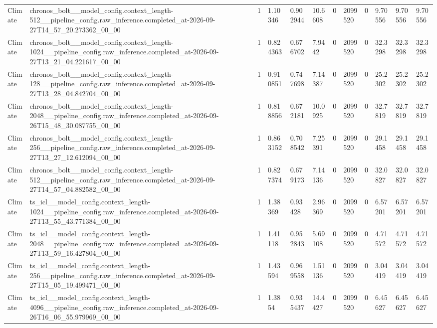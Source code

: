 \begin{tabular}{llllllllllll}
Climate & chronos\_bolt\_\_model\_config.context\_length-512\_\_pipeline\_config.raw\_inference.completed\_at-2026-09-27T14\_57\_20.273362\_00\_00 & 1 & 1.10346 & 0.902944 & 10.6608 & 0 & 2099520 & 0 & 9.70556 & 9.70556 & 9.70556 \\
Climate & chronos\_bolt\_\_model\_config.context\_length-1024\_\_pipeline\_config.raw\_inference.completed\_at-2026-09-27T13\_21\_04.221617\_00\_00 & 1 & 0.824363 & 0.676702 & 7.9442 & 0 & 2099520 & 0 & 32.3298 & 32.3298 & 32.3298 \\
Climate & chronos\_bolt\_\_model\_config.context\_length-128\_\_pipeline\_config.raw\_inference.completed\_at-2026-09-27T13\_28\_04.842704\_00\_00 & 1 & 0.910851 & 0.747698 & 7.14387 & 0 & 2099520 & 0 & 25.2302 & 25.2302 & 25.2302 \\
Climate & chronos\_bolt\_\_model\_config.context\_length-2048\_\_pipeline\_config.raw\_inference.completed\_at-2026-09-26T15\_48\_30.087755\_00\_00 & 1 & 0.818856 & 0.672181 & 10.0925 & 0 & 2099520 & 0 & 32.7819 & 32.7819 & 32.7819 \\
Climate & chronos\_bolt\_\_model\_config.context\_length-256\_\_pipeline\_config.raw\_inference.completed\_at-2026-09-27T13\_27\_12.612094\_00\_00 & 1 & 0.863152 & 0.708542 & 7.25391 & 0 & 2099520 & 0 & 29.1458 & 29.1458 & 29.1458 \\
Climate & chronos\_bolt\_\_model\_config.context\_length-512\_\_pipeline\_config.raw\_inference.completed\_at-2026-09-27T14\_57\_04.882582\_00\_00 & 1 & 0.827374 & 0.679173 & 7.14136 & 0 & 2099520 & 0 & 32.0827 & 32.0827 & 32.0827 \\
Climate & ts\_icl\_\_model\_config.context\_length-1024\_\_pipeline\_config.raw\_inference.completed\_at-2026-09-27T13\_55\_43.771384\_00\_00 & 1 & 1.38369 & 0.93428 & 2.96369 & 0 & 2099520 & 0 & 6.57201 & 6.57201 & 6.57201 \\
Climate & ts\_icl\_\_model\_config.context\_length-2048\_\_pipeline\_config.raw\_inference.completed\_at-2026-09-27T13\_59\_16.427804\_00\_00 & 1 & 1.41118 & 0.952843 & 5.69108 & 0 & 2099520 & 0 & 4.71572 & 4.71572 & 4.71572 \\
Climate & ts\_icl\_\_model\_config.context\_length-256\_\_pipeline\_config.raw\_inference.completed\_at-2026-09-27T15\_05\_19.499471\_00\_00 & 1 & 1.43594 & 0.969558 & 1.51136 & 0 & 2099520 & 0 & 3.04419 & 3.04419 & 3.04419 \\
Climate & ts\_icl\_\_model\_config.context\_length-4096\_\_pipeline\_config.raw\_inference.completed\_at-2026-09-26T16\_06\_55.979969\_00\_00 & 1 & 1.3854 & 0.935437 & 14.4427 & 0 & 2099520 & 0 & 6.45627 & 6.45627 & 6.45627 \\

\end{tabular}
